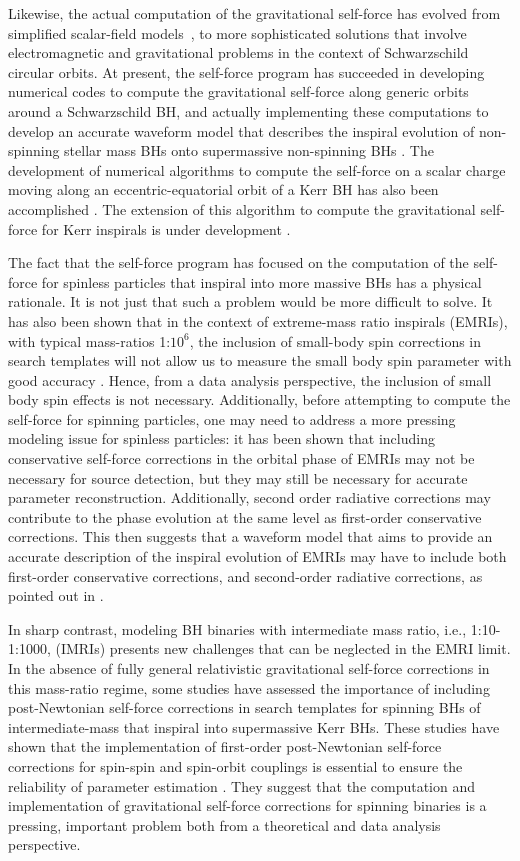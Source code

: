 Likewise, the actual computation of the gravitational self-force has evolved from  simplified scalar-field models~\cite{scasf}, to more sophisticated solutions that involve electromagnetic and gravitational problems in the context  of Schwarzschild circular orbits. At present, the self-force program has succeeded in developing numerical codes to compute the gravitational self-force along generic orbits around a Schwarzschild BH, and actually implementing these computations to develop an accurate waveform model that describes the inspiral evolution of non-spinning stellar mass BHs onto supermassive non-spinning BHs \cite{wargar}. The development of numerical algorithms to compute the self-force on a scalar charge moving along an eccentric-equatorial orbit of a Kerr BH has also been accomplished \cite{war}. The extension of this algorithm to compute the gravitational self-force for Kerr inspirals is under development  \cite{war,warleor}. 

The fact that the self-force program has focused on the computation of the self-force for spinless particles that inspiral into more massive BHs has a physical rationale. It is not just that such a problem would be more difficult to solve. It has also been shown that in the context of extreme-mass ratio inspirals (EMRIs), with typical mass-ratios 1:\(10^{6}\), the inclusion of small-body spin corrections in search templates will not allow us to measure the small body spin parameter with good accuracy  \cite{smallbody}. Hence, from a data analysis perspective, the inclusion of small body spin effects is not necessary.  Additionally, before attempting to compute the self-force for spinning particles, one may need to address a more pressing modeling issue for spinless particles: it has been shown that including conservative self-force corrections in the orbital phase of EMRIs may not be necessary for source detection, but they may still be necessary for accurate parameter reconstruction. Additionally, second 
order radiative corrections may contribute to the phase evolution at the same level as first-order conservative corrections. %
This then suggests that a waveform model that aims to provide an accurate description of the inspiral evolution of EMRIs may have to include both first-order conservative corrections, and second-order radiative corrections, as pointed out in \cite{wargar}. 


In sharp contrast, modeling BH binaries with intermediate mass ratio, i.e., 1:10-1:1000, (IMRIs) presents new challenges that can be neglected in the EMRI limit.  In the absence of fully general relativistic gravitational self-force corrections in this mass-ratio regime, some studies have assessed the importance of including post-Newtonian self-force corrections in search templates for spinning BHs of intermediate-mass that inspiral into supermassive Kerr BHs. These studies have shown that the implementation of first-order post-Newtonian self-force corrections for spin-spin and spin-orbit couplings is essential to ensure the reliability of parameter estimation \cite{higherspin}.  They suggest that the computation and implementation of gravitational self-force corrections for spinning binaries is a pressing, important problem both from a theoretical and data analysis perspective. 

